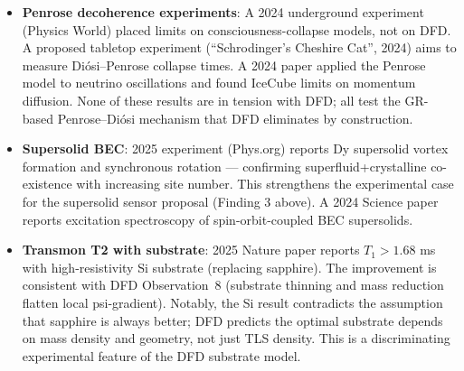 \documentclass[11pt]{article}
\theoremstyle{definition}
\theoremstyle{remark}
\begin{document}
\begin{itemize}
  \item \textbf{Penrose decoherence experiments}: A 2024 underground experiment
    (Physics World) placed limits on consciousness-collapse models, not on DFD.
    A proposed tabletop experiment (``Schrodinger's Cheshire Cat'', 2024) aims to
    measure Di\'osi--Penrose collapse times.  A 2024 paper applied the Penrose
    model to neutrino oscillations and found IceCube limits on momentum diffusion.
    None of these results are in tension with DFD; all test the GR-based
    Penrose--Di\'osi mechanism that DFD eliminates by construction.

  \item \textbf{Supersolid BEC}: 2025 experiment (Phys.org) reports Dy supersolid
    vortex formation and synchronous rotation --- confirming superfluid+crystalline
    co-existence with increasing site number.  This strengthens the experimental
    case for the supersolid sensor proposal (Finding 3 above).  A 2024 Science
    paper reports excitation spectroscopy of spin-orbit-coupled BEC supersolids.

  \item \textbf{Transmon T2 with substrate}: 2025 Nature paper reports
    $T_1 > 1.68$ ms with high-resistivity Si substrate (replacing sapphire).
    The improvement is consistent with DFD Observation~8 (substrate thinning
    and mass reduction flatten local psi-gradient).  Notably, the Si result
    contradicts the assumption that sapphire is always better; DFD predicts
    the optimal substrate depends on mass density and geometry, not just
    TLS density.  This is a discriminating experimental feature of the DFD
    substrate model.
\end{itemize}
\end{document}

